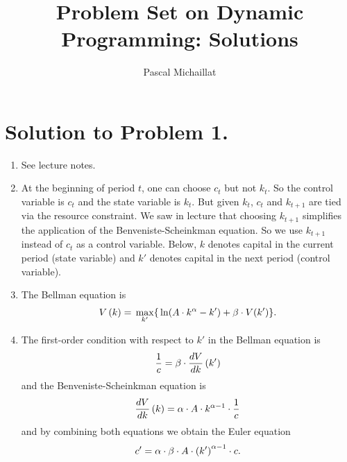 \documentclass[letterpaper,12pt,leqno]{article}
\begin{document}
\title{Problem Set on Dynamic Programming: Solutions}
\author{Pascal Michaillat}
\date{}

\begin{titlepage}
\maketitle
\end{titlepage}

\section*{Solution to Problem 1.}

\begin{enumerate}
\item See lecture notes.
\item At the beginning of period $t$, one can choose $c_{t}$ but not $k_{t}$. So the control variable is $c_{t}$ and the state variable is $k_{t}$. But given $k_{t}$, $c_{t}$ and $k_{t+1}$ are tied via the resource constraint. We saw in lecture that choosing $k_{t+1}$ simplifies the application of the Benveniste-Scheinkman equation. So we use $k_{t+1}$ instead of $c_{t}$ as a control variable.  Below, $k$ denotes capital in the current period (state variable) and $k'$ denotes capital in the next period (control variable).
\item The Bellman equation is 
\begin{align*}
V\bp{k} =\max[k']{\ln{A\cdot k^{\a}-k'} +\b\cdot V(k')}.
\end{align*}
\item The first-order condition with respect to $k'$ in the Bellman equation is
\begin{align}
\frac{1}{c} =\beta \cdot \frac{d V}{d k}\left( k' \right)\label{eq:EQ1}
\end{align}
and the Benveniste-Scheinkman equation is
\begin{align*}
\frac{d V}{d k}\left( k \right) =\alpha\cdot  A\cdot k^{\alpha -1}\cdot \frac{1}{c} 
\end{align*}
and by combining both equations we obtain the Euler equation
\begin{align*}
c' =\alpha \cdot \beta \cdot A\cdot \left( k' \right)^{\alpha -1}\cdot c .
\end{align*}


\end{enumerate}
\end{document}
